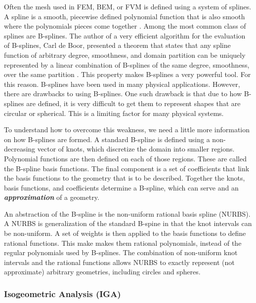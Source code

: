 
      Often the mesh used in FEM, BEM, or FVM is defined using a system of splines. A spline is a smooth, piecewise defined polynomial function that is also smooth where the polynomials pieces come together \cite{judd1998}. Among the most common class of splines are B-splines. The author of a very efficient algorithm for the evaluation of B-splines, Carl de Boor, presented a theorem that states that any spline function of arbitrary degree, smoothness, and domain partition can be uniquely represented by a linear combination of B-splines of the same degree, smoothness, over the same partition \cite{deBoor2001}. This property makes B-splines a very powerful tool. For this reason. B-splines have been used in many physical applications. However, there are drawbacks to using B-splines. One such drawback is that due to how B-splines are defined, it is very difficult to get them to represent shapes that are circular or spherical. This is a limiting factor for many physical systems.

      To understand how to overcome this weakness, we need a little more information on how B-splines are formed. A standard B-spline is defined using a non-decreasing vector of knots, which discretize the domain into smaller regions. Polynomial functions are then defined on each of those regions. These are called the B-spline basis functions. The final component is a set of coefficients that link the basis functions to the geometry that is to be described. Together the knots, basis functions, and coefficients determine a B-spline, which can serve and an \textbf{\textit{approximation}} of a geometry.

      An abstraction of the B-spline is the non-uniform rational basis spline (NURBS). A NURBS is generalization of the standard B-spine in that the knot intervals can be non-uniform. A set of weights is then applied to the basis functions to define rational functions. This make makes them rational polynomials, instead of the regular polynomials used by B-splines. The combination of non-uniform knot intervals and the rational functions allows NURBS to exactly represent (not approximate) arbitrary geometries, including circles and spheres.

    \subsubsection{Isogeometric Analysis (IGA)} \label{ssub:isogeometric_analysis_iga}

